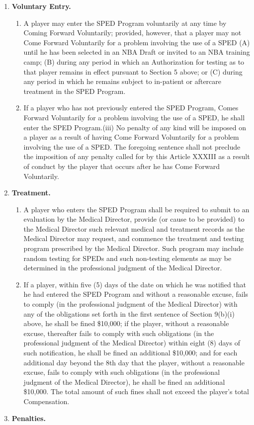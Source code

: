 \documentclass[
]{book}
\providecommand{\tightlist}{%
  \setlength{\itemsep}{0pt}\setlength{\parskip}{0pt}}
\begin{document}
\begin{enumerate}
\def\labelenumi{(\alph{enumi})}
\item
  \textbf{Voluntary Entry.}

  \begin{enumerate}
  \def\labelenumii{(\roman{enumii})}
  \tightlist
  \item
    A player may enter the SPED Program voluntarily at any time by Coming Forward Voluntarily; provided, however, that a player may not Come Forward Voluntarily for a problem involving the use of a SPED (A) until he has been selected in an NBA Draft or invited to an NBA training camp; (B) during any period in which an Authorization for testing as to that player remains in effect pursuant to Section 5 above; or (C) during any period in which he remains subject to in-patient or aftercare treatment in the SPED Program.
  \item
    If a player who has not previously entered the SPED Program, Comes Forward Voluntarily for a problem involving the use of a SPED, he shall enter the SPED Program.(iii) No penalty of any kind will be imposed on a player as a result of having Come Forward Voluntarily for a problem involving the use of a SPED. The foregoing sentence shall not preclude the imposition of any penalty called for by this Article XXXIII as a result of conduct by the player that occurs after he has Come Forward Voluntarily.
  \end{enumerate}
\item
  \textbf{Treatment.}

  \begin{enumerate}
  \def\labelenumii{(\roman{enumii})}
  \tightlist
  \item
    A player who enters the SPED Program shall be required to submit to an evaluation by the Medical Director, provide (or cause to be provided) to the Medical Director such relevant medical and treatment records as the Medical Director may request, and commence the treatment and testing program prescribed by the Medical Director. Such program may include random testing for SPEDs and such non-testing elements as may be determined in the professional judgment of the Medical Director.
  \item
    If a player, within five (5) days of the date on which he was notified that he had entered the SPED Program and without a reasonable excuse, fails to comply (in the professional judgment of the Medical Director) with any of the obligations set forth in the first sentence of Section 9(b)(i) above, he shall be fined \$10,000; if the player, without a reasonable excuse, thereafter fails to comply with such obligations (in the professional judgment of the Medical Director) within eight (8) days of such notification, he shall be fined an additional \$10,000; and for each additional day beyond the 8th day that the player, without a reasonable excuse, fails to comply with such obligations (in the professional judgment of the Medical Director), he shall be fined an additional \$10,000. The total amount of such fines shall not exceed the player's total Compensation.
  \end{enumerate}
\item
  \textbf{Penalties.}


\end{enumerate}
\end{document}

